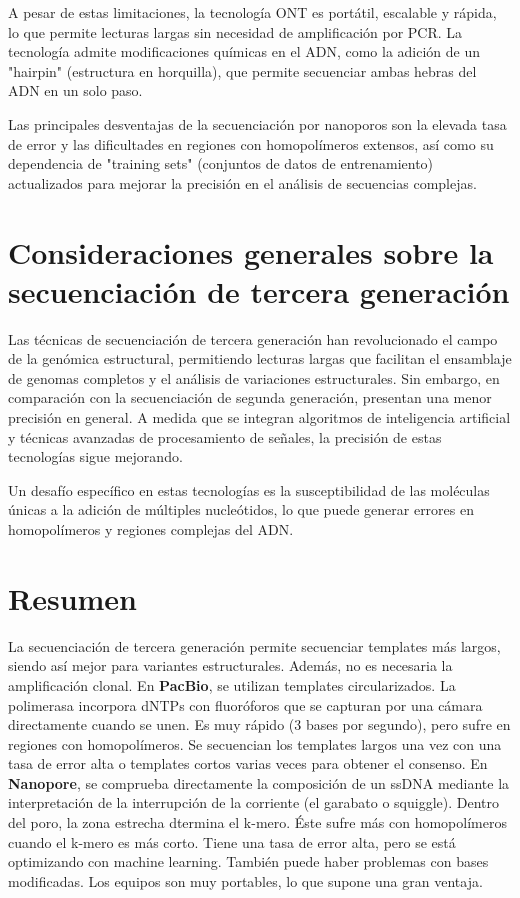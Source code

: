 \begin{itemize}
A pesar de estas limitaciones, la tecnología ONT es portátil, escalable y rápida, lo que permite lecturas largas sin necesidad de amplificación por PCR. La tecnología admite modificaciones químicas en el ADN, como la adición de un "hairpin" (estructura en horquilla), que permite secuenciar ambas hebras del ADN en un solo paso.

Las principales desventajas de la secuenciación por nanoporos son la elevada tasa de error y las dificultades en regiones con homopolímeros extensos, así como su dependencia de "training sets" (conjuntos de datos de entrenamiento) actualizados para mejorar la precisión en el análisis de secuencias complejas.

\section{Consideraciones generales sobre la secuenciación de tercera generación}
Las técnicas de secuenciación de tercera generación han revolucionado el campo de la genómica estructural, permitiendo lecturas largas que facilitan el ensamblaje de genomas completos y el análisis de variaciones estructurales. Sin embargo, en comparación con la secuenciación de segunda generación, presentan una menor precisión en general. A medida que se integran algoritmos de inteligencia artificial y técnicas avanzadas de procesamiento de señales, la precisión de estas tecnologías sigue mejorando.

Un desafío específico en estas tecnologías es la susceptibilidad de las moléculas únicas a la adición de múltiples nucleótidos, lo que puede generar errores en homopolímeros y regiones complejas del ADN.

\section{Resumen}
La secuenciación de tercera generación permite secuenciar templates más largos, siendo así mejor para variantes estructurales. Además, no es necesaria la amplificación clonal. En \textbf{PacBio}, se utilizan templates circularizados. La polimerasa incorpora dNTPs con fluoróforos que se capturan por una cámara directamente cuando se unen. Es muy rápido (3 bases por segundo), pero sufre en regiones con homopolímeros. Se secuencian los templates largos una vez con una tasa de error alta o templates cortos varias veces para obtener el consenso. En \textbf{Nanopore}, se comprueba directamente la composición de un ssDNA mediante la interpretación de la interrupción de la corriente (el garabato o squiggle). Dentro del poro, la zona estrecha dtermina el k-mero. Éste sufre más con homopolímeros cuando el k-mero es más corto. Tiene una tasa de error alta, pero se está optimizando con machine learning. También puede haber problemas con bases modificadas. Los equipos son muy portables, lo que supone una gran ventaja.


\end{itemize}
